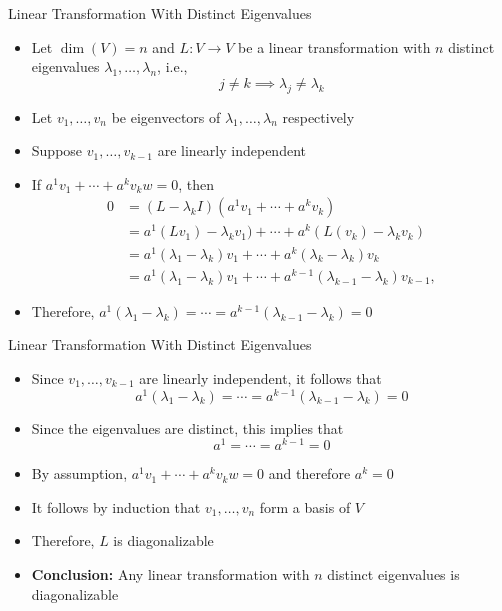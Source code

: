 \documentclass[usenames,dvipsnames,10pt]{beamer}
\begin{document}
\begin{frame}
  {Linear Transformation With Distinct Eigenvalues}

  \begin{itemize}
  \item Let $\dim(V) = n$ and $L: V \rightarrow V$ be a linear transformation with $n$ distinct eigenvalues $\lambda_1, \dots, \lambda_n$, i.e.,
    \[ j \ne k \implies \lambda_j \ne \lambda_k \]
  \item Let $v_1, \dots, v_n$ be eigenvectors of $\lambda_1, \dots, \lambda_n$ respectively
  \item Suppose $v_1, \dots, v_{k-1}$ are linearly independent
  \item If $a^1v_1 + \cdots + a^kv_kw  = 0$, then
    \begin{align*}
      0 &= (L-\lambda_kI)(a^1v_1 + \cdots + a^kv_k)\\
        &= a^1(Lv_1)-\lambda_kv_1)+\cdots + a^k(L(v_k)-\lambda_kv_k)\\
        &= a^1(\lambda_1-\lambda_k)v_1 + \cdots + a^k(\lambda_k-\lambda_k)v_k\\
        &= a^1(\lambda_1-\lambda_k)v_1 + \cdots + a^{k-1}(\lambda_{k-1}-\lambda_k)v_{k-1},
    \end{align*}
  \item Therefore, $a^1(\lambda_1-\lambda_k) = \cdots = a^{k-1}(\lambda_{k-1}-\lambda_k) = 0$
  \end{itemize}
\end{frame}

\begin{frame}
  {Linear Transformation With Distinct Eigenvalues}

  \begin{itemize}
  \item Since $v_1, \dots, v_{k-1}$ are linearly independent, it follows that
    \[  a^1(\lambda_1-\lambda_k) = \cdots = a^{k-1}(\lambda_{k-1}-\lambda_k) = 0 \]
  \item Since the eigenvalues are distinct, this implies that
    \[ a^1 = \cdots = a^{k-1} = 0 \]
  \item By assumption, $a^1v_1 + \cdots + a^kv_kw  = 0$ and therefore $a^k = 0$
  \item It follows by induction that $v_1, \dots, v_n$ form a basis of $V$
  \item Therefore, $L$ is diagonalizable
  \item {\bf Conclusion: }Any linear transformation with $n$ distinct eigenvalues is diagonalizable
  \end{itemize}
\end{frame}
\end{document}
